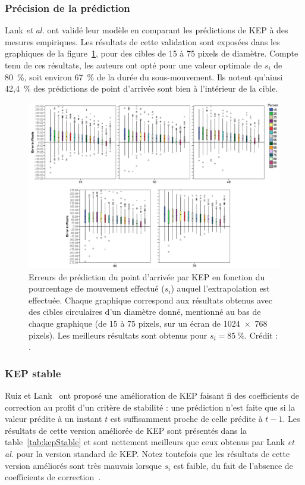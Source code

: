 \begin{appendices}
	\subsubsection{Précision de la prédiction}
	Lank \emph{et al.} ont validé leur modèle en comparant les prédictions de KEP à des mesures empiriques. Les résultats de cette validation sont exposées dans les graphiques de la figure~\ref{fig:kepErrors}, pour des cibles de 15 à 75 pixels de diamètre. Compte tenu de ces résultats, les auteurs ont opté pour une valeur optimale de $s_{i}$ de 80~\%{}, soit environ 67~\%{} de la durée du sous-mouvement. Ils notent qu'ainsi 42,4~\%{} des prédictions de point d'arrivée sont bien à l'intérieur de la cible.
	
	\begin{figure}[htbp]
		\centering
		\includegraphics[width=\textwidth]{figures/ch2/kepErrors}
		\caption[KEP -- erreurs de prédiction]{Erreurs de prédiction du point d'arrivée par KEP en fonction du pourcentage de mouvement effectué ($s_{i}$) auquel l'extrapolation est effectuée. Chaque graphique correspond aux résultats obtenus avec des cibles circulaires d'un diamètre donné, mentionné au bas de chaque graphique (de 15 à 75 pixels, sur un écran de 1024~$\times$~768 pixels). Les meilleurs résultats sont obtenus pour $s_{i} = 85~\%{}$. Crédit : \cite{lank2007endpoint}.}
		\label{fig:kepErrors}
	\end{figure}
	
	\subsubsection{KEP stable}
	Ruiz et Lank~\cite{ruiz2009effects} ont proposé une amélioration de KEP faisant fi des coefficients de correction au profit d'un critère de stabilité : une prédiction n'est faite que si la valeur prédite à un instant $t$ est suffisamment proche de celle prédite à $t-1$. Les résultats de cette version améliorée de KEP sont présentés dans la table~\ref{tab:kepStable} et sont nettement meilleurs que ceux obtenus par Lank \emph{et al.} pour la version standard de KEP. Notez toutefois que les résultats de cette version améliorés sont très mauvais lorsque $s_{i}$ est faible, du fait de l'absence de coefficients de correction~\cite{ruiz2009effects}.
	

\end{appendices}
